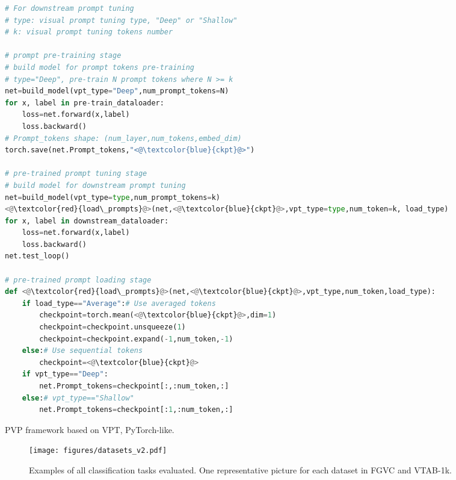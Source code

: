 \documentclass[10pt,journal,letterpaper,compsoc]{IEEEtran}
\begin{document}
\begin{algorithm}[t]
\begin{lstlisting}[language=Python]
# For downstream prompt tuning
# type: visual prompt tuning type, "Deep" or "Shallow"
# k: visual prompt tuning tokens number

# prompt pre-training stage
# build model for prompt tokens pre-training
# type="Deep", pre-train N prompt tokens where N >= k
net=build_model(vpt_type="Deep",num_prompt_tokens=N)
for x, label in pre-train_dataloader:
    loss=net.forward(x,label)
    loss.backward()
# Prompt_tokens shape: (num_layer,num_tokens,embed_dim)
torch.save(net.Prompt_tokens,"<@\textcolor{blue}{ckpt}@>")

# pre-trained prompt tuning stage
# build model for downstream prompt tuning
net=build_model(vpt_type=type,num_prompt_tokens=k)
<@\textcolor{red}{load\_prompts}@>(net,<@\textcolor{blue}{ckpt}@>,vpt_type=type,num_token=k, load_type)
for x, label in downstream_dataloader:
    loss=net.forward(x,label)
    loss.backward()
net.test_loop()

# pre-trained prompt loading stage
def <@\textcolor{red}{load\_prompts}@>(net,<@\textcolor{blue}{ckpt}@>,vpt_type,num_token,load_type):
    if load_type=="Average":# Use averaged tokens
        checkpoint=torch.mean(<@\textcolor{blue}{ckpt}@>,dim=1)
        checkpoint=checkpoint.unsqueeze(1)
        checkpoint=checkpoint.expand(-1,num_token,-1)
    else:# Use sequential tokens
        checkpoint=<@\textcolor{blue}{ckpt}@>
    if vpt_type=="Deep":
        net.Prompt_tokens=checkpoint[:,:num_token,:]
    else:# vpt_type=="Shallow"
        net.Prompt_tokens=checkpoint[:1,:num_token,:]
\end{lstlisting}
\caption{PVP framework based on VPT, PyTorch-like.}
\label{alg:vppt}
\end{algorithm}

\begin{figure*}[!htbp]
    \centering
    \texttt{[image: figures/datasets\_v2.pdf]}
    \caption{Examples of all classification tasks evaluated. One representative picture for each dataset in \textcolor{color_fgvc}{FGVC} and \textcolor{color_vtab}{VTAB-1k}.}
    \label{fig:dataexps}
\end{figure*}
\end{document}
